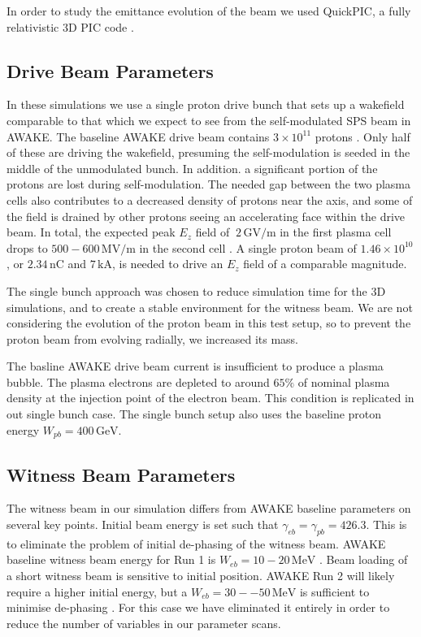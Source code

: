 \documentclass[aps,prstab,reprint,amsmath,amssymb,groupedaddress]{revtex4-1}
\newcommand{\unit}[1]{\,\mathrm{#1}}
\newcommand{\funit}[2]{\,\mathrm{#1}/\mathrm{#2}}
\newcommand{\nexp}[1]{\times 10^{#1}}
\begin{document}
In order to study the emittance evolution of the beam we used QuickPIC, a fully relativistic 3D PIC code
\cite{huang:2006, an:2013}.

\subsection[\label{S:M:Setup}]{Drive Beam Parameters}

In these simulations we use a single proton drive bunch that sets up a wakefield comparable to that which we expect to
see from the self-modulated SPS beam in AWAKE. The baseline AWAKE drive beam contains $3\nexp{11}$ protons
\cite{gschwendtner:2016}. Only half of these are driving the wakefield, presuming the self-modulation is seeded in the
middle of the unmodulated bunch. In addition. a significant portion of the protons are lost during self-modulation. The
needed gap between the two plasma cells also contributes to a decreased density of protons near the axis, and some of
the field is drained by other protons seeing an accelerating face within the drive beam. In total, the expected peak
$E_{z}$ field of $~2\funit{GV}{m}$ in the first plasma cell drops to $500-600\funit{MV}{m}$ in the second cell
\cite{awake_collaboration:2016}. A single proton beam of $1.46\nexp{10}$, or $2.34\unit{nC}$ and $7\unit{kA}$, is needed
to drive an $E_{z}$ field of a comparable magnitude.

The single bunch approach was chosen to reduce simulation time for the 3D simulations, and to create a stable
environment for the witness beam. We are not considering the evolution of the proton beam in this test setup, so to
prevent the proton beam from evolving radially, we increased its mass.

The basline AWAKE drive beam current is insufficient to produce a plasma bubble. The plasma electrons are depleted to
around $65\%$ of nominal plasma density at the injection point of the electron beam. This condition is replicated in out
single bunch case. The single bunch setup also uses the baseline proton energy $W_{pb} = 400\unit{GeV}$.

\subsection[\label{S:M:Setup}]{Witness Beam Parameters}

The witness beam in our simulation differs from AWAKE baseline parameters on several key points. Initial beam energy is
set such that $\gamma_{eb} = \gamma_{pb} = 426.3$. This is to eliminate the problem of initial de-phasing of the witness
beam. AWAKE baseline witness beam energy for Run 1 is $W_{eb} = 10-20\unit{MeV}$ \cite{gschwendtner:2016}. Beam loading
of a short witness beam is sensitive to initial position. AWAKE Run 2 will likely require a higher initial energy, but a
$W_{eb} = 30--50\unit{MeV}$ is sufficient to minimise de-phasing \cite{berglyd_olsen:2015}. For this case we have
eliminated it entirely in order to reduce the number of variables in our parameter scans.
\end{document}

